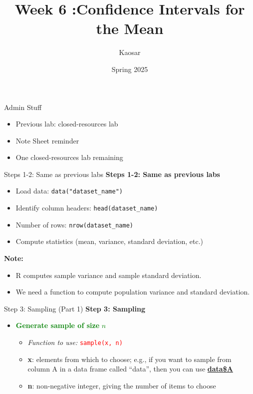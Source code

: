 \documentclass{beamer}
\title{Week 6 :Confidence Intervals for the Mean}
\author{Kaosar}
\institute{Auburn University}
\date{Spring 2025}
\begin{document}
\frame{\titlepage}

\begin{frame}{Admin Stuff}
    \begin{itemize}
        \item Previous lab: closed-resources lab
        \item Note Sheet reminder
        \item One closed-resources lab remaining
    \end{itemize}
\end{frame}

\begin{frame}{Steps 1-2: Same as previous labs}
    \textbf{Steps 1-2: Same as previous labs}
    \begin{itemize}
        \item Load data: \texttt{data("dataset\_name")}
        \item Identify column headers: \texttt{head(dataset\_name)}
        \item Number of rows: \texttt{nrow(dataset\_name)}
        \item Compute statistics (mean, variance, standard deviation, etc.)
    \end{itemize}
    \textbf{Note:}
    \begin{itemize}
        \item R computes sample variance and sample standard deviation.
        \item We need a function to compute population variance and standard deviation.
    \end{itemize}
\end{frame}


\begin{frame}{Step 3: Sampling (Part 1)}
    \textbf{Step 3: Sampling}
    \begin{itemize}
        \item \textcolor{green}{\textbf{Generate sample of size} \underline{$n$}}
        \begin{itemize}
            \item \textit{Function to use:} \textcolor{red}{\texttt{sample(x, n)}}
            \item \textbf{x}: elements from which to choose; e.g., if you want to sample from column A in a data frame called “data”, then you can use \textbf{\underline{data\$A}}
            \item \textbf{n}: non-negative integer, giving the number of items to choose
        \end{itemize}
    \end{itemize}
\end{frame}
\end{document}

